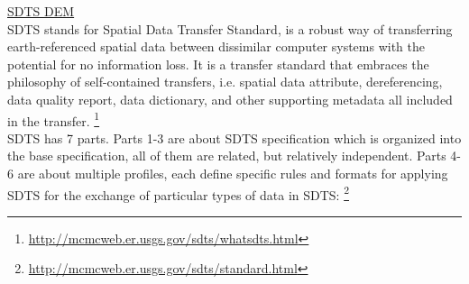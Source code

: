\documentclass[11pt]{article}
\begin{document}
\noindent \underline{SDTS DEM}\\
SDTS stands for Spatial Data Transfer Standard, is a robust way of transferring earth-referenced spatial data between dissimilar computer systems with the potential for no information loss. It is a transfer standard that embraces the philosophy of self-contained transfers, i.e. spatial data attribute, dereferencing, data quality report, data dictionary, and other supporting metadata all included in the transfer. \footnote{\url{http://mcmcweb.er.usgs.gov/sdts/whatsdts.html}}\\ 
SDTS has 7 parts. Parts 1-3 are about SDTS specification which is organized into the base specification, all of them are related, but relatively independent. Parts 4-6 are about multiple profiles, each define specific rules and formats for applying SDTS for the exchange of particular types of data in SDTS: \footnote{\url{http://mcmcweb.er.usgs.gov/sdts/standard.html}}
\end{document}
